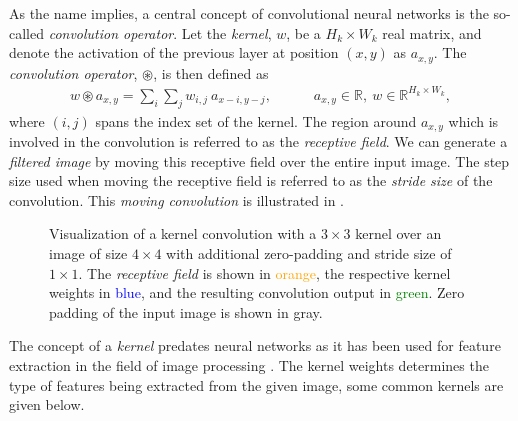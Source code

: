 As the name implies, a central concept of convolutional neural networks is the so-called \textit{convolution operator}.
Let the \textit{kernel}, $w$, be a $H_k \times W_k$ real matrix, and denote the activation of the previous layer at position $(x, y)$ as $a_{x, y}$.
The \textit{convolution operator}, $\circledast$, is then defined as
%
\begin{align*}
  w \circledast a_{x, y} = \sum_{i} \sum_{j} w_{i, j} ~ a_{x - i, y - j},
  \hspace{3em}
    a_{x, y} \in \mathbb{R},~
    w \in \mathbb{R}^{H_k \times W_k},
\end{align*}
%
where $(i, j)$ spans the index set of the kernel.
The region around $a_{x,y}$ which is involved in the convolution is referred to as the \textit{receptive field}.
We can generate a \textit{filtered image} by moving this receptive field over the entire input image.
The step size used when moving the receptive field is referred to as the \textit{stride size} of the convolution.
This \textit{moving convolution} is illustrated in .

\begin{figure}[htb]
  
  \caption{
    Visualization of a kernel convolution with a $3 \times 3$ kernel over an image of size $4 \times 4$ with additional zero-padding and stride size of $1 \times 1$.
    The \textit{receptive field} is shown in \textcolor{orange}{orange}, the respective kernel weights in \textcolor{blue}{blue}, and the resulting convolution output in \textcolor{green}{green}.
    Zero padding of the input image is shown in gray.
  }
  \label{fig:convolution}
\end{figure}

The concept of a \textit{kernel} predates neural networks as it has been used for feature extraction in the field of image processing \cite[p.~11]{computer_vision_history}.
The kernel weights determines the type of features being extracted from the given image, some common kernels are given below.

